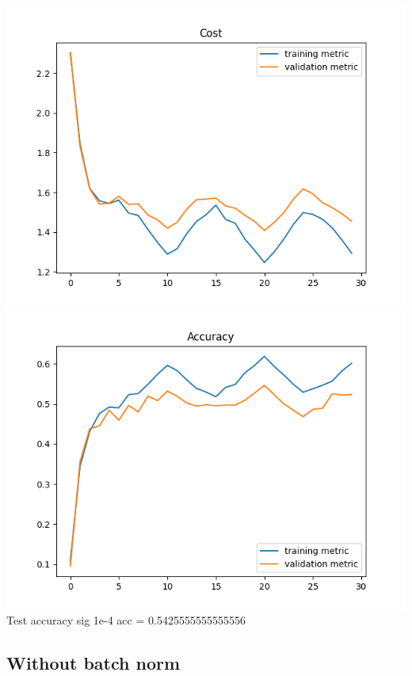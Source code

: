 \documentclass[11pt,a4paper]{article}
\begin{document}
\includegraphics[width=\textwidth]{batch_norm_sig=1e-4_cost-.png}
\includegraphics[width=\textwidth]{batch_norm_sig=1e-4_accuracy-.png}
Test accuracy sig 1e-4 acc = 0.5425555555555556\\

\subsection{Without batch norm}
\end{document}
